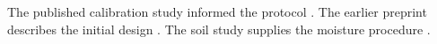 \documentclass{article}
\begin{document}
The published calibration study informed the protocol \citep{river2024,river_short}.
The earlier preprint describes the initial design \citep{river_preprint}.
The soil study supplies the moisture procedure \citep{shared}.



\end{document}
